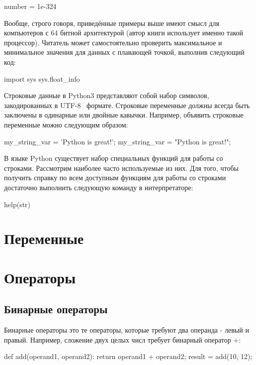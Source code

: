 \begin{python}
number = 1e-324
\end{python}

Вообще, строго говоря, приведённые примеры выше имеют смысл для компьютеров с 64 
битной архитектурой (автор книги использует именно такой процессор). Читатель
может самостоятельно проверить максимальное и минимальное значения для данных с плавающей 
точкой, выполнив следующий код:

\begin{python}
import sys
sys.float_info
\end{python}

Строковые данные в Python3 представляют собой набор символов, 
закодированных в UTF-8~\cite{} формате. Строковые переменные должны всегда 
быть заключены в одинарные или двойные кавычки. Например, 
объявить строковые переменные можно следующим образом:

\begin{python}
my_string_var = 'Python is great!';
my_string_var = "Python is great!";
\end{python}

В языке Python существует набор специальных функций для работы со строками.
Рассмотрим наиболее часто используемые из них. Для того, чтобы получить 
справку по всем доступным функциям для работы со строками достаточно выполнить 
следующую команду в интерпретаторе:

\begin{python}
help(str)
\end{python}

\section{Переменные}

\section{Операторы}

\subsection{Бинарные операторы}

Бинарные операторы это те операторы, которые требуют два операнда - левый и 
правый. Например, сложение двух целых числ требует бинарный оператор $+$:

\begin{python}
def add(operand1, operand2):
	return operand1 + operand2;
result = add(10, 12);
\end{python}

